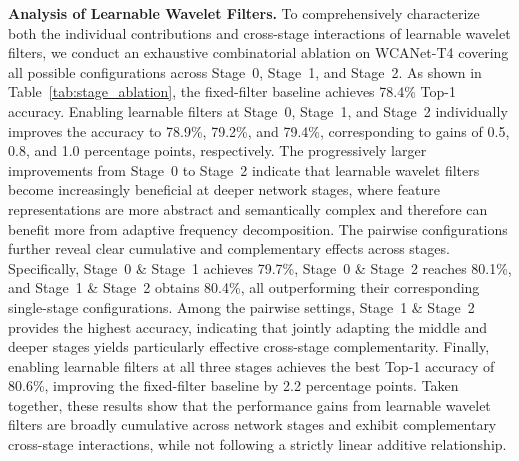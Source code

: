 \documentclass[a4paper,fleqn]{cas-dc}
\begin{document}
{\textbf{Analysis of Learnable Wavelet Filters.}
\color{green}
To comprehensively characterize both the individual contributions and cross-stage interactions of learnable wavelet filters, we conduct an exhaustive combinatorial ablation on WCANet-T4 covering all possible configurations across Stage~0, Stage~1, and Stage~2.
As shown in Table~\ref{tab:stage_ablation}, the fixed-filter baseline achieves 78.4\% Top-1 accuracy. Enabling learnable filters at Stage~0, Stage~1, and Stage~2 individually improves the accuracy to 78.9\%, 79.2\%, and 79.4\%, corresponding to gains of 0.5, 0.8, and 1.0 percentage points, respectively.
The progressively larger improvements from Stage~0 to Stage~2 indicate that learnable wavelet filters become increasingly beneficial at deeper network stages, where feature representations are more abstract and semantically complex and therefore can benefit more from adaptive frequency decomposition.
The pairwise configurations further reveal clear cumulative and complementary effects across stages. Specifically, Stage~0 \& Stage~1 achieves 79.7\%, Stage~0 \& Stage~2 reaches 80.1\%, and Stage~1 \& Stage~2 obtains 80.4\%, all outperforming their corresponding single-stage configurations.
Among the pairwise settings, Stage~1 \& Stage~2 provides the highest accuracy, indicating that jointly adapting the middle and deeper stages yields particularly effective cross-stage complementarity.
Finally, enabling learnable filters at all three stages achieves the best Top-1 accuracy of 80.6\%, improving the fixed-filter baseline by 2.2 percentage points.
Taken together, these results show that the performance gains from learnable wavelet filters are broadly cumulative across network stages and exhibit complementary cross-stage interactions, while not following a strictly linear additive relationship.
}






\end{document}
